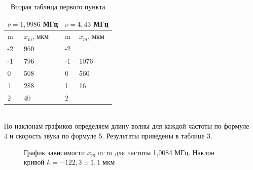 \documentclass[a4paper,12pt]{article} %
\begin{document}
\begin{table}[h]
\begin{tabular}{|ll|ll|}
\hline
\multicolumn{2}{|l|}{$\nu = 1,9986$ МГц} & \multicolumn{2}{c|}{$\nu = 4,43 $ МГц} \\ \hline
\multicolumn{1}{|l|}{m}    & $x_{m}$, мкм   & \multicolumn{1}{l|}{m}    & $x_{m}$, мкм  \\ \hline
\multicolumn{1}{|l|}{-2}   & 960         & \multicolumn{1}{l|}{-2}   &            \\ \hline
\multicolumn{1}{|l|}{-1}   & 796         & \multicolumn{1}{l|}{-1}   & 1076       \\ \hline
\multicolumn{1}{|l|}{0}    & 508         & \multicolumn{1}{l|}{0}    & 560        \\ \hline
\multicolumn{1}{|l|}{1}    & 288         & \multicolumn{1}{l|}{1}    & 16         \\ \hline
\multicolumn{1}{|l|}{2}    & 40          & \multicolumn{1}{l|}{2}    &            \\ \hline
\end{tabular}
\caption{Вторая таблица первого пункта}
\end{table}
\\
По наклонам графиков определяем длину волны для каждой частоты по формуле 4 и скорость звука по формуле 5. Результаты приведены в таблице 3.
\\
\begin{figure}[H]
  \caption{\centering График зависимости $x_{m}$ от m для частоты 1,0084 МГц. Наклон кривой $k = -122,3 \pm 1,1$ мкм
}
	\label{fig:image1}
\end{figure}
\end{document}
